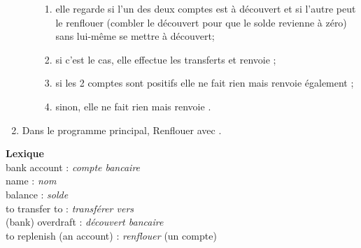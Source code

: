 \documentclass[a4paper,12pt]{article}
\begin{document}
\begin{enumerate}[\bfseries 1.]
\begin{enumerate}[--]
                        \begin{enumerate}[--]
                        	\item 	elle regarde si l'un des deux comptes est à découvert et si l'autre peut le renflouer (combler le découvert pour que le solde revienne à zéro) sans lui-même se mettre à découvert;
                        	\item 	si c'est le cas, elle effectue les transferts et renvoie ;
                            \item 	si les 2 comptes sont positifs elle ne fait rien mais renvoie également ;
                            \item 	sinon, elle ne fait rien mais renvoie .
                        \end{enumerate}
            \end{enumerate}
    \item 	Dans le programme principal, Renflouer  avec .
\end{enumerate}
\textbf{Lexique}\\

bank account : \textit{compte bancaire}\\
name : \textit{nom}\\
balance : \textit{solde}\\
to transfer to : \textit{transférer vers}\\
(bank) overdraft : \textit{découvert bancaire}\\
to replenish (an account) : \textit{renflouer} (un compte)
\end{document}
